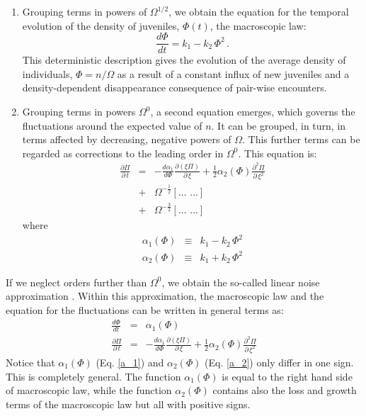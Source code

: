 \begin{enumerate}
\item Grouping terms in powers of $\Omega^{1/2}$, we obtain the equation for the temporal evolution of the density of juveniles, $\Phi(t)$, the macroscopic law:
\begin{equation}
\label{macroscopic_law}
\frac{d\Phi}{dt} = k_{1} - k_{2}\,\Phi^2\,.
\end{equation}
This deterministic description gives the evolution of the average density of individuals, $\Phi=n/\Omega$ as a result of a constant influx of new juveniles and a density-dependent disappearance consequence of pair-wise encounters. 
\item Grouping terms in powers $\Omega^0$, a second equation emerges, which governs the fluctuations around the expected value of $n$. It can be grouped, in turn, in terms affected by decreasing, negative powers of $\Omega$. This further terms can be regarded as corrections to the leading order in $\Omega^0$. This equation is:
\begin{eqnarray}
\label{linear}
\frac{\partial\Pi}{\partial\,t}&=&-\frac{d\alpha_1}{d\Phi}\frac{\partial(\xi\Pi)}{\partial\,\xi}+\frac{1}{2}\alpha_2(\Phi)\frac{\partial^2\Pi}{\partial\,\xi^2}\\
                               &+&\Omega^{-\frac{1}{2}}\left[\dots\,\,\dots\right]\nonumber\\
                               &+&\Omega^{-\frac{3}{2}}\left[\dots\,\,\dots\right]\nonumber
\end{eqnarray} 
where
\begin{eqnarray}
\label{a_1}
\alpha_1(\Phi) &\equiv& k_{1} - k_{2}\,\Phi^2 \\ 
\alpha_2(\Phi) &\equiv& k_{1} + k_{2}\,\Phi^2
\label{a_2}
\end{eqnarray} 
\end{enumerate}

If we neglect orders further than $\Omega^{0}$, we obtain the so-called linear noise approximation \cite{vanKampen92}. Within this approximation, the macroscopic law and the equation for the fluctuations can be written in general terms as:
\begin{eqnarray}
\frac{d\Phi}{dt} &=& \alpha_1(\Phi)\\
\frac{\partial\Pi}{\partial\,t}&=&-\frac{d\alpha_1}{d\Phi}\frac{\partial(\xi\Pi)}{\partial\,\xi}+\frac{1}{2}\alpha_2(\Phi)\frac{\partial^2\Pi}{\partial\,\xi^2}
\label{linear_noise}
\end{eqnarray}
Notice that $\alpha_1(\Phi)$ (Eq. \ref{a_1}) and $\alpha_2(\Phi)$ (Eq. \ref{a_2}) only differ in one sign. This is completely general. The function $\alpha_1(\Phi)$ is equal to the right hand side of macroscopic law, while the function $\alpha_2(\Phi)$ contains also the loss and growth terms of the macroscopic law but all with positive signs. 

